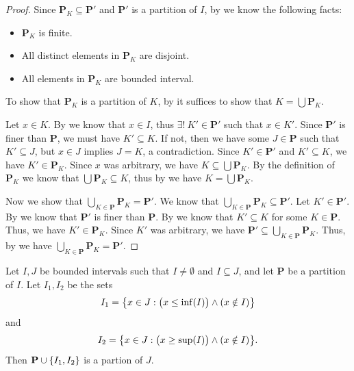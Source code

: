 \begin{proof}
  Since \(\mathbf{P}_K \subseteq \mathbf{P}'\) and \(\mathbf{P}'\) is a partition of \(I\), by  we know the following facts:
  \begin{itemize}
    \item \(\mathbf{P}_K\) is finite.
    \item All distinct elements in \(\mathbf{P}_K\) are disjoint.
    \item All elements in \(\mathbf{P}_K\) are bounded interval.
  \end{itemize}
  To show that \(\mathbf{P}_K\) is a partition of \(K\), by  it suffices to show that \(K = \bigcup \mathbf{P}_K\).

  Let \(x \in K\).
  By  we know that \(x \in I\), thus \(\exists!\ K' \in \mathbf{P}'\) such that \(x \in K'\).
  Since \(\mathbf{P}'\) is finer than \(\mathbf{P}\), we must have \(K' \subseteq K\).
  If not, then we have some \(J \in \mathbf{P}\) such that \(K' \subseteq J\), but \(x \in J\) implies \(J = K\), a contradiction.
  Since \(K' \in \mathbf{P}'\) and \(K' \subseteq K\), we have \(K' \in \mathbf{P}_K\).
  Since \(x\) was arbitrary, we have \(K \subseteq \bigcup \mathbf{P}_K\).
  By the definition of \(\mathbf{P}_K\) we know that \(\bigcup \mathbf{P}_K \subseteq K\), thus by  we have \(K = \bigcup \mathbf{P}_K\).

  Now we show that \(\bigcup_{K \in \mathbf{P}} \mathbf{P}_K = \mathbf{P}'\).
  We know that \(\bigcup_{K \in \mathbf{P}} \mathbf{P}_K \subseteq \mathbf{P}'\).
  Let \(K' \in \mathbf{P}'\).
  By  we know that \(\mathbf{P}'\) is finer than \(\mathbf{P}\).
  By  we know that \(K' \subseteq K\) for some \(K \in \mathbf{P}\).
  Thus, we have \(K' \in \mathbf{P}_K\).
  Since \(K'\) was arbitrary, we have \(\mathbf{P}' \subseteq \bigcup_{K \in \mathbf{P}} \mathbf{P}_K\).
  Thus, by  we have \(\bigcup_{K \in \mathbf{P}} \mathbf{P}_K = \mathbf{P}'\).
\end{proof}

\begin{ac}\label{i:ac:11.1.5}
  Let \(I, J\) be bounded intervals such that \(I \neq \emptyset\) and \(I \subseteq J\), and let \(\mathbf{P}\) be a partition of \(I\).
  Let \(I_1, I_2\) be the sets
  \[
    I_1 = \left\lbrace x \in J : \big(x \leq \inf(I)\big) \land (x \notin I)\right\rbrace
  \]
  and
  \[
    I_2 = \set{x \in J : \big(x \geq \sup(I)\big) \land (x \notin I)}.
  \]
  Then \(\mathbf{P} \cup \left\lbrace I_1, I_2\right\rbrace\) is a partion of \(J\).
\end{ac}

